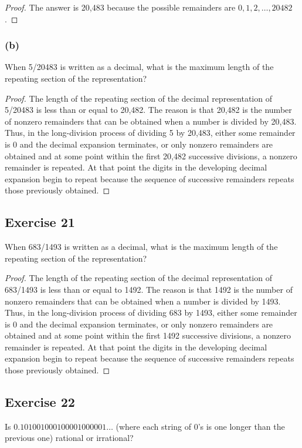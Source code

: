\documentclass[14pt]{extarticle}
\begin{document}
\begin{proof}
     The answer is 20,483 because the possible remainders are \(0, 1, 2, \ldots, 20482\).
\end{proof}

\subsubsection{(b)}
When 5/20483 is written as a decimal, what is the maximum length of the repeating section of the representation?

\begin{proof}
     The length of the repeating section of the decimal representation of 5/20483 is less than or equal to 20,482.
     The reason is that 20,482 is the number of nonzero remainders that can be obtained when a number is divided by
     20,483. Thus, in the long-division process of dividing 5 by 20,483, either some remainder is 0 and the decimal
     expansion terminates, or only nonzero remainders are obtained and at some point within the first 20,482
     successive divisions, a nonzero remainder is repeated. At that point the digits in the developing decimal expansion
     begin to repeat because the sequence of successive remainders repeats those previously obtained.
\end{proof}

\subsection{Exercise 21}
When 683/1493 is written as a decimal, what is the maximum length of the repeating section of the representation?

\begin{proof}
     The length of the repeating section of the decimal representation of 683/1493 is less than or equal to 1492.
     The reason is that 1492 is the number of nonzero remainders that can be obtained when a number is divided by 1493.
     Thus, in the long-division process of dividing 683 by 1493, either some remainder is 0 and the decimal expansion
     terminates, or only nonzero remainders are obtained and at some point within the first 1492 successive divisions, a
     nonzero remainder is repeated. At that point the digits in the developing decimal expansion begin to repeat because
     the sequence of successive remainders repeats those previously obtained.
\end{proof}

\subsection{Exercise 22}
Is \(0.101001000100001000001 \ldots\) (where each string of 0’s is one longer than the previous one) rational or
irrational?
\end{document}
